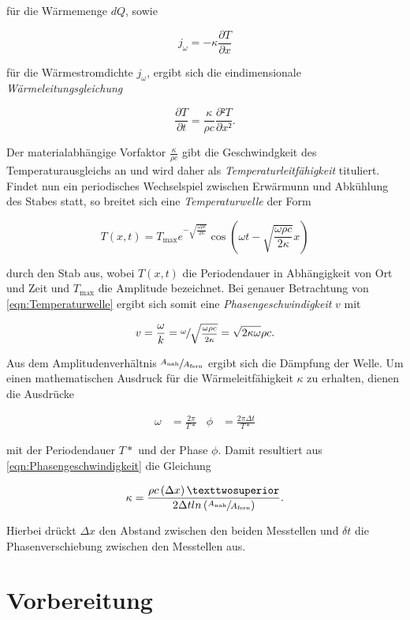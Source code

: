 für die Wärmemenge $dQ$, sowie

\begin{equation}
    j_\omega = -\kappa \frac{\partial{}T}{\partial{}x}
\end{equation}

für die Wärmestromdichte $j_\omega$, ergibt sich die eindimensionale \emph{Wärmeleitungsgleichung}

\begin{equation}
    \frac{\partial T}{\partial t} = \frac{\kappa}{\rho c} \frac{\partial² T}{\partial x²}.
\end{equation}

Der materialabhängige Vorfaktor $\frac{\kappa}{\rho c}$ gibt die Geschwindgkeit des Temperaturausgleichs 
an und wird daher als \emph{Temperaturleitfähigkeit} tituliert. \\
Findet nun ein periodisches Wechselspiel zwischen Erwärmunn und Abkühlung des Stabes statt,
so breitet sich eine \emph{Temperaturwelle} der Form

\begin{equation}
\label{eqn:Temperaturwelle}
    T(x,t) = T_{\mathrm{max}} e^{-\sqrt{\frac{\omega \rho c}{2\kappa}}}\cos\left(\omega t - \sqrt{\frac{\omega \rho c}{2\kappa}}x\right)
\end{equation}

durch den Stab aus, wobei $T(x,t)$ die Periodendauer in Abhängigkeit von Ort und Zeit und $T_\text{max}$ die Amplitude bezeichnet.
Bei genauer Betrachtung von \eqref{eqn:Temperaturwelle} ergibt sich somit eine \emph{Phasengeschwindigkeit} $v$ mit 

\begin{equation}
\label{eqn:Phasengeschwindigkeit}
    v = \frac{\omega}{k} = \sfrac{\omega}{\sqrt{\frac{\omega \rho c}{2\kappa}}} = \sqrt{2\kappa \omega}{\rho c}.
\end{equation}

Aus dem Amplitudenverhältnis $\sfrac{A_\text{nah}}{A_\text{fern}}$ ergibt sich die Dämpfung der Welle. Um einen mathematischen Ausdruck 
für die Wärmeleitfähigkeit $\kappa$ zu erhalten, dienen die Ausdrücke 

\begin{align*}
    \omega &= \frac{2\pi}{T*} & \phi &= \frac{2\pi \Delta t}{T*}
\end{align*}

mit der Periodendauer $T*$ und der Phase $\phi$. Damit resultiert aus \eqref{eqn:Phasengeschwindigkeit} die Gleichung

\begin{equation}
    \kappa = \frac{\rho c \left(\Delta x\right)²}{2\Delta t ln\left(\sfrac{A_\text{nah}}{A_\text{fern}}\right)}.
\end{equation}

Hierbei drückt $\Delta x$ den Abstand zwischen den beiden Messtellen und $\delta t$ die Phasenverschiebung zwischen den Messtellen aus.


\section{Vorbereitung}
\cite{sample}

